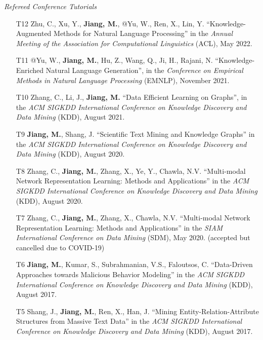 \documentclass[10pt]{article}
\newenvironment{myindentpar}[1]%
{\begin{list}{}%
         {\setlength{\leftmargin}{#1}}%
         \item[]%
}
{\end{list}}
\newcounter{list}
\begin{document}
\begin{myindentpar}{0.00cm}
\begin{enumerate}[leftmargin=.5cm]
\end{enumerate}

\hspace{-0.25cm}\textit{Refereed Conference Tutorials}

\begin{enumerate}[leftmargin=.5cm]

\item[T12] Zhu, C., Xu, Y., \textbf{Jiang, M.}, @Yu, W., Ren, X., Lin, Y. ``Knowledge-Augmented Methods for Natural Language Processing'' in the \textit{Annual Meeting of the Association for Computational Linguistics} (ACL), May 2022.

\item[T11] @Yu, W., \textbf{Jiang, M.}, Hu, Z., Wang, Q., Ji, H., Rajani, N. ``Knowledge-Enriched Natural Language Generation'', in the \textit{Conference on Empirical Methods in Natural Language Processing} (EMNLP), November 2021.

\item[T10] Zhang, C., Li, J., \textbf{Jiang, M.} ``Data Efficient Learning on Graphs'', in the \textit{ACM SIGKDD International Conference on Knowledge Discovery and Data Mining} (KDD), August 2021.
		
\item[T9] \textbf{Jiang, M.}, Shang, J. ``Scientific Text Mining and Knowledge Graphs'' in the \textit{ACM SIGKDD International Conference on Knowledge Discovery and Data Mining} (KDD), August 2020.
		
\item[T8] Zhang, C., \textbf{Jiang, M.}, Zhang, X., Ye, Y., Chawla, N.V. ``Multi-modal Network Representation Learning: Methods and Applications'' in the \textit{ACM SIGKDD International Conference on Knowledge Discovery and Data Mining} (KDD), August 2020.

\item[T7] Zhang, C., \textbf{Jiang, M.}, Zhang, X., Chawla, N.V. ``Multi-modal Network Representation Learning: Methods and Applications'' in the \textit{SIAM International Conference on Data Mining} (SDM), May 2020. (accepted but cancelled due to COVID-19)

\item[T6] \textbf{Jiang, M.}, Kumar, S., Subrahmanian, V.S., Faloutsos, C. ``Data-Driven Approaches towards Malicious Behavior Modeling'' in the \textit{ACM SIGKDD International Conference on Knowledge Discovery and Data Mining} (KDD), August 2017.

\item[T5] Shang, J., \textbf{Jiang, M.}, Ren, X., Han, J. ``Mining Entity-Relation-Attribute Structures from Massive Text Data'' in the \textit{ACM SIGKDD International Conference on Knowledge Discovery and Data Mining} (KDD), August 2017.


\end{enumerate}
\end{myindentpar}
\end{document}
